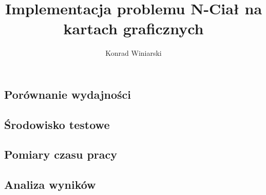 \documentclass[12pt]{article}
\author{Konrad Winiarski}
\title{Implementacja problemu N-Ciał na kartach graficznych}
\begin{document}
\maketitle
\pagebreak

\begin{flushleft}














\section { Porównanie wydajności }
\subsection {Środowisko testowe}
\subsection {Pomiary czasu pracy}
\subsection {Analiza wyników}





\end{flushleft}
\end{document}
